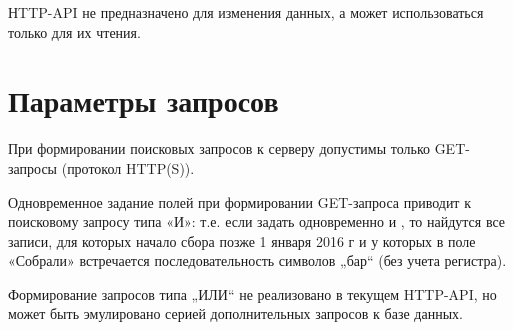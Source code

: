 \documentclass[letterpaper,10pt,russian]{sphinxmanual}
\begin{document}
НTTP-API не предназначено для изменения данных, а может использоваться только для их чтения.

\ignorespaces 

\section{Параметры запросов}
\label{\detokenize{http_api:id4}}\label{\detokenize{http_api:index-1}}
При формировании поисковых запросов к серверу допустимы только GET-запросы (протокол HTTP(S)).

Одновременное задание полей при формировании GET-запроса приводит к поисковому запросу типа «И»: т.е. если задать одновременно  и , то найдутся все записи, для которых начало сбора позже 1 января 2016 г и у которых в поле «Собрали» встречается последовательность символов „бар“ (без учета регистра).

Формирование запросов типа „ИЛИ“ не реализовано в текущем HTTP-API, но может быть эмулировано серией дополнительных запросов к базе данных.
\end{document}
